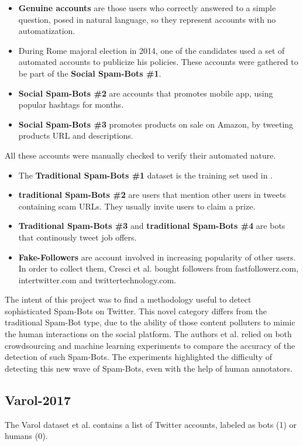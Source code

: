 \normalsize
\begin{itemize}
	\item \textbf{Genuine accounts} are those users who correctly answered to a simple question, posed in natural language, so they represent accounts with no automatization.
	\item  During Rome majoral election in 2014, one of the candidates used a set of automated accounts to publicize his policies. These accounts were gathered to be part of the \textbf{Social Spam-Bots \#1}.
	\item \textbf{Social Spam-Bots \#2} are accounts that promotes mobile app, using popular hashtags for months.
	\item  \textbf{Social Spam-Bots \#3} promotes products on sale on Amazon, by tweeting products URL and descriptions.
\end{itemize}
All these accounts were manually checked to verify their automated nature.

\begin{itemize}
	\item The \textbf{Traditional Spam-Bots \#1} dataset is the training set used in \cite{Yang}.
	\item \textbf{traditional Spam-Bots \#2} are users that mention other users in tweets containing scam URLs. They usually invite users to claim a prize.
	\item  \textbf{Traditional Spam-Bots \#3} and \textbf{traditional Spam-Bots \#4} are bots that continously tweet job offers.
	\item \textbf{Fake-Followers} are account involved in increasing popularity of other users. In order to collect them, Cresci et al. \cite{Cresci} bought followers from fastfollowerz.com, intertwitter.com and twittertechnology.com.
\end{itemize}

The intent of this project was to find a methodology useful to detect sophisticated Spam-Bots on Twitter. This novel category differs from the traditional Spam-Bot type, due to the ability of those content polluters to mimic the human interactions on the social platform. The authors et al. \cite{Cresci} relied on both crowdsourcing and machine learning experiments to compare the accuracy of the detection of such Spam-Bots. The experiments highlighted the difficulty of detecting this new wave of Spam-Bots, even with the help of human annotators.


\subsection{Varol-2017}
The Varol dataset et al. \cite{Varol} contains a list of Twitter accounts, labeled as bots (1) or humans (0).

